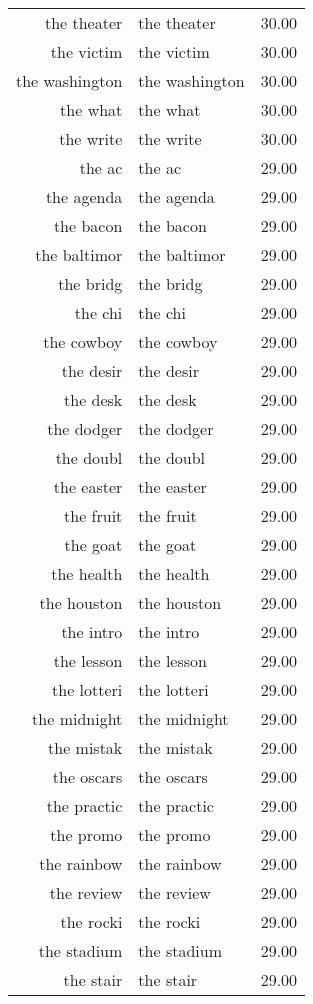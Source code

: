 \begin{table}[ht]
\begin{tabular}{rlr}
  the theater & the theater & 30.00 \\ 
  the victim & the victim & 30.00 \\ 
  the washington & the washington & 30.00 \\ 
  the what & the what & 30.00 \\ 
  the write & the write & 30.00 \\ 
  the ac & the ac & 29.00 \\ 
  the agenda & the agenda & 29.00 \\ 
  the bacon & the bacon & 29.00 \\ 
  the baltimor & the baltimor & 29.00 \\ 
  the bridg & the bridg & 29.00 \\ 
  the chi & the chi & 29.00 \\ 
  the cowboy & the cowboy & 29.00 \\ 
  the desir & the desir & 29.00 \\ 
  the desk & the desk & 29.00 \\ 
  the dodger & the dodger & 29.00 \\ 
  the doubl & the doubl & 29.00 \\ 
  the easter & the easter & 29.00 \\ 
  the fruit & the fruit & 29.00 \\ 
  the goat & the goat & 29.00 \\ 
  the health & the health & 29.00 \\ 
  the houston & the houston & 29.00 \\ 
  the intro & the intro & 29.00 \\ 
  the lesson & the lesson & 29.00 \\ 
  the lotteri & the lotteri & 29.00 \\ 
  the midnight & the midnight & 29.00 \\ 
  the mistak & the mistak & 29.00 \\ 
  the oscars & the oscars & 29.00 \\ 
  the practic & the practic & 29.00 \\ 
  the promo & the promo & 29.00 \\ 
  the rainbow & the rainbow & 29.00 \\ 
  the review & the review & 29.00 \\ 
  the rocki & the rocki & 29.00 \\ 
  the stadium & the stadium & 29.00 \\ 
  the stair & the stair & 29.00 \\ 

\end{tabular}
\end{table}
